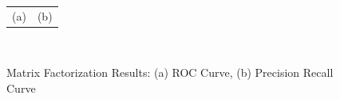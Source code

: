 \begin{figure}[t]
\begin{tabular}{ l l}
  \hspace{3.5cm}(a) & \hspace{7cm}(b)\\
\end{tabular}\\
\caption{Matrix Factorization Results: (a) ROC Curve, (b) Precision Recall Curve}
\label{fig:matrix_curves}  
\end{figure}


